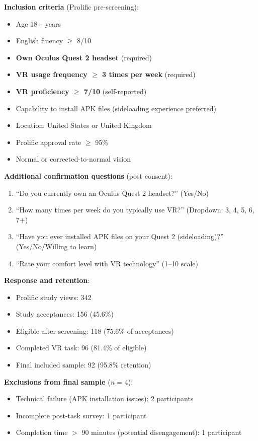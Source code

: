 \documentclass[12pt]{article}
\begin{document}
\textbf{Inclusion criteria} (Prolific pre-screening):
\begin{itemize}
    \item Age 18+ years
    \item English fluency $\geq$ 8/10
    \item \textbf{Own Oculus Quest 2 headset} (required)
    \item \textbf{VR usage frequency $\geq$ 3 times per week} (required)
    \item \textbf{VR proficiency $\geq$ 7/10} (self-reported)
    \item Capability to install APK files (sideloading experience preferred)
    \item Location: United States or United Kingdom
    \item Prolific approval rate $\geq$ 95\%
    \item Normal or corrected-to-normal vision
\end{itemize}

\textbf{Additional confirmation questions} (post-consent):
\begin{enumerate}
    \item ``Do you currently own an Oculus Quest 2 headset?'' (Yes/No)
    \item ``How many times per week do you typically use VR?'' (Dropdown: 3, 4, 5, 6, 7+)
    \item ``Have you ever installed APK files on your Quest 2 (sideloading)?'' (Yes/No/Willing to learn)
    \item ``Rate your comfort level with VR technology'' (1--10 scale)
\end{enumerate}

\textbf{Response and retention}:
\begin{itemize}
    \item Prolific study views: 342
    \item Study acceptances: 156 (45.6\%)
    \item Eligible after screening: 118 (75.6\% of acceptances)
    \item Completed VR task: 96 (81.4\% of eligible)
    \item Final included sample: 92 (95.8\% retention)
\end{itemize}

\textbf{Exclusions from final sample} (\textit{n} = 4):
\begin{itemize}
    \item Technical failure (APK installation issues): 2 participants
    \item Incomplete post-task survey: 1 participant
    \item Completion time $>$ 90 minutes (potential disengagement): 1 participant
\end{itemize}
\end{document}
